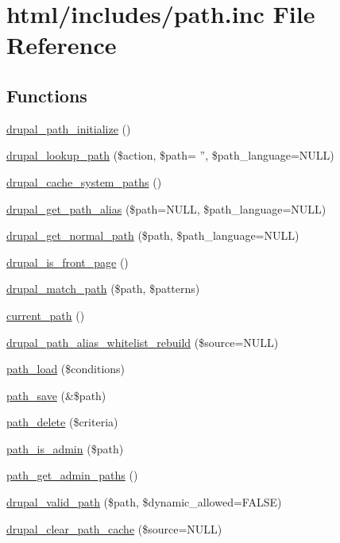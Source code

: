 \hypertarget{path_8inc}{
\section{html/includes/path.inc File Reference}
\label{path_8inc}
}
\subsection*{Functions}
\begin{DoxyCompactItemize}
\item 
\hyperlink{path_8inc_ad19e2051aeae309fbf3be8bd072e6fed}{drupal\_\-path\_\-initialize} ()
\item 
\hyperlink{path_8inc_a3c1a94088895986eedd4358367355e33}{drupal\_\-lookup\_\-path} (\$action, \$path= '', \$path\_\-language=NULL)
\item 
\hyperlink{path_8inc_a60e3f93b8388973df3e4f98788fd5388}{drupal\_\-cache\_\-system\_\-paths} ()
\item 
\hyperlink{path_8inc_a889ab7f9eebf37ac353abc264a290131}{drupal\_\-get\_\-path\_\-alias} (\$path=NULL, \$path\_\-language=NULL)
\item 
\hyperlink{path_8inc_a59781811cbcdef4c64ccd1d55e1ae9f8}{drupal\_\-get\_\-normal\_\-path} (\$path, \$path\_\-language=NULL)
\item 
\hyperlink{path_8inc_a657eb4770879ad6f0dc19bfad2cd4a6d}{drupal\_\-is\_\-front\_\-page} ()
\item 
\hyperlink{path_8inc_a1299e390360982cc8fbebe06f0232e18}{drupal\_\-match\_\-path} (\$path, \$patterns)
\item 
\hyperlink{path_8inc_a97aaa03027cbf6f0ffdd9a4bf5c9a31c}{current\_\-path} ()
\item 
\hyperlink{path_8inc_a98ce949c6766328b89a2b98f31359b14}{drupal\_\-path\_\-alias\_\-whitelist\_\-rebuild} (\$source=NULL)
\item 
\hyperlink{path_8inc_ac1be3b94cdca2d9b6e9a9e78043500f2}{path\_\-load} (\$conditions)
\item 
\hyperlink{path_8inc_a2560e9e01e6d4f6b38c4e55c39715e25}{path\_\-save} (\&\$path)
\item 
\hyperlink{path_8inc_adbe589627a12c7be338700a1df1bc357}{path\_\-delete} (\$criteria)
\item 
\hyperlink{path_8inc_abf34fb440d7de9c9e8dfa0ec1a2ac72d}{path\_\-is\_\-admin} (\$path)
\item 
\hyperlink{path_8inc_acc77f0daab31d02be34e83a61ad3991c}{path\_\-get\_\-admin\_\-paths} ()
\item 
\hyperlink{path_8inc_a43d22f8b0e8644306276b7707378a33a}{drupal\_\-valid\_\-path} (\$path, \$dynamic\_\-allowed=FALSE)
\item 
\hyperlink{path_8inc_ac2787f2b1d751f7c77e7ef3db2ff11e1}{drupal\_\-clear\_\-path\_\-cache} (\$source=NULL)
\end{DoxyCompactItemize}


